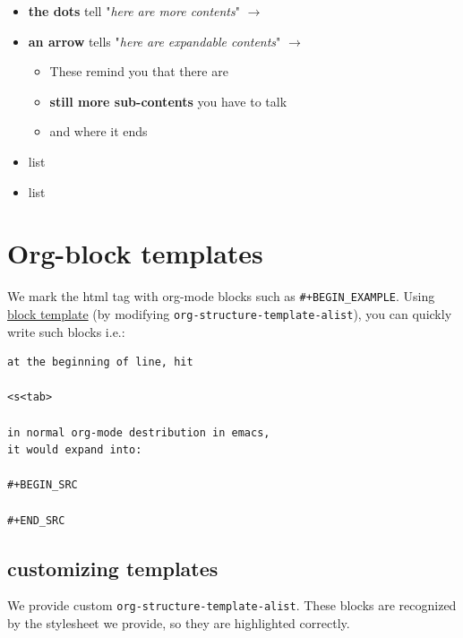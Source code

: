 \begin{itemize}
\item \textbf{the dots} tell "\emph{here are more contents}" \(\rightarrow\)
\item \textbf{an arrow} tells "\emph{here are expandable contents}" \(\rightarrow\)
\begin{itemize}
\item These remind you that there are
\item \textbf{still more sub-contents} you have to talk
\item and where it ends
\end{itemize}
\item list
\item list
\end{itemize}


\section{Org-block templates}
\label{sec-6}

We mark the html tag with org-mode blocks such as \texttt{\#+BEGIN\_EXAMPLE}.
Using \href{http://orgmode.org/manual/Easy-Templates.html}{block template} (by modifying \texttt{org-structure-template-alist}),
you can quickly write such blocks i.e.:

\begin{verbatim}
at the beginning of line, hit

<s<tab>

in normal org-mode destribution in emacs,
it would expand into:

#+BEGIN_SRC 

#+END_SRC
\end{verbatim}

\subsection{customizing templates}
\label{sec-6-1}

We provide custom \texttt{org-structure-template-alist}.
These blocks are recognized by the stylesheet we provide,
so they are highlighted correctly.

